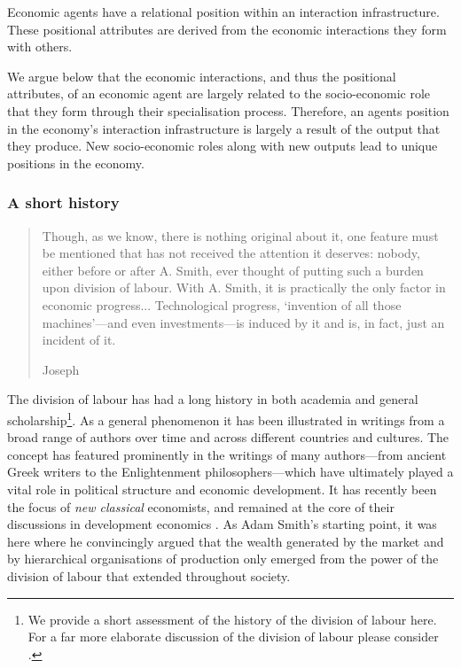 \begin{lemma} \label{con:positionalattributes}
Economic agents have a relational position within an interaction infrastructure. These positional attributes are derived from the economic interactions they form with others.
\end{lemma}

We argue below that the economic interactions, and thus the positional attributes, of an economic agent are largely related to the socio-economic role that they form through their specialisation process. Therefore, an agents position in the economy's interaction infrastructure is largely a result of the output that they produce. New socio-economic roles along with new outputs lead to unique positions in the economy.

\subsubsection{A short history}

\begin{quote}
Though, as we know, there is nothing original about it, one feature must be mentioned that has not received the attention it deserves: nobody, either before or after A. Smith, ever thought of putting such a burden upon division of labour. With A. Smith, it is practically the only factor in economic progress... Technological progress, `invention of all those machines'---and even investments---is induced by it and is, in fact, just an incident of it.

\begin{flushright}
Joseph \citet[p.~182]{Schumpeter1954}
\end{flushright}
\end{quote}

The division of labour has had a long history in both academia and general scholarship\footnote{We provide a short assessment of the history of the division of labour here. For a far more elaborate discussion of the division of labour please consider \citet{Sun2012}.}. As a general phenomenon it has been illustrated in writings from a broad range of authors over time and across different countries and cultures. The concept has featured prominently in the writings of many authors---from ancient Greek writers to the Enlightenment philosophers---which have ultimately played a vital role in political structure and economic development. It has recently been the focus of \emph{new classical} economists, and remained at the core of their discussions in development economics \citep{Yang2003}. As Adam Smith's starting point, it was here where he convincingly argued that the wealth generated by the market and by hierarchical organisations of production only emerged from the power of the division of labour that extended throughout society.

